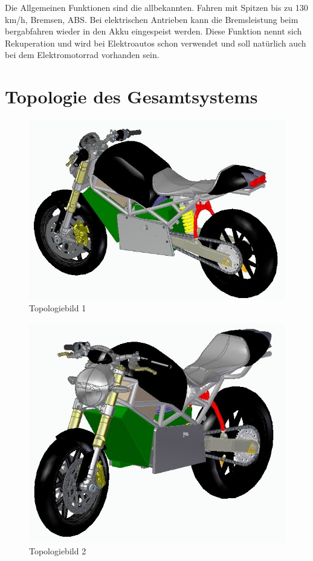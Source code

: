 Die Allgemeinen Funktionen sind die allbekannten. Fahren mit Spitzen bis zu 130 km/h, Bremsen, ABS. Bei elektrischen Antrieben kann die Bremsleistung beim bergabfahren wieder in den Akku eingespeist werden. Diese Funktion nennt sich Rekuperation und wird bei Elektroautos schon verwendet und soll natürlich auch bei dem Elektromotorrad vorhanden sein.
\newpage

\section{Topologie des Gesamtsystems}

\begin{figure} [H]
	\begin{center}
		\includegraphics[scale=0.9] {figures/mechanik/Ducati1.jpg}
		\caption{Topologiebild 1}
		\label{fig:Topologiebild 1}
	\end{center}
\end{figure}

\begin{figure} [H]
	\begin{center}
		\includegraphics[scale=0.9] {figures/mechanik/Ducati2.jpg}
		\caption{Topologiebild 2}
		\label{fig:Topologiebild 2}
	\end{center}
\end{figure}

